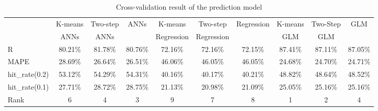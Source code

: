 \begin{table}[hbtp]
  \begin{center}
    \caption{Cross-validation result of the prediction model}
    \label{tab:is_result}
    \scriptsize
    \begin{tabular}{l c c c c c c c c c}
      \hline
       & K-means & Two-step & ANNs & K-means    & Two-step   & Regression & K-means & Two-Step & GLM \\
       &   ANNs  &   ANNs   &      & Regression & Regression &            &   GLM   &   GLM    & \\ 
      \hline
	   R              & 80.21\% & 81.78\% & 80.76\% & 72.16\% & 72.16\% & 72.15\% & 87.41\% & 87.11\% & 87.05\% \\
       MAPE           & 28.69\% & 26.64\% & 26.51\% & 46.06\% & 46.05\% & 46.05\% & 24.68\% & 24.70\% & 24.71\% \\
       hit\_rate(0.2) & 53.12\% & 54.29\% & 54.31\% & 40.16\% & 40.17\% & 40.21\% & 48.82\% & 48.64\% & 48.52\% \\
       hit\_rate(0.1) & 27.71\% & 28.72\% & 28.75\% & 21.13\% & 20.98\% & 21.09\% & 25.05\% & 25.16\% & 25.16\% \\
      \hline
       Rank & 6 & 4 & 3 & 9 & 7 & 8 & 1 & 2 & 4 \\
      \hline
      \end{tabular}
  \end{center}
\end{table}

